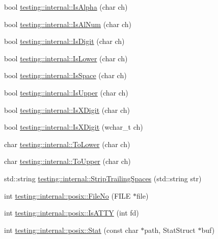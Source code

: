 \begin{DoxyCompactItemize}
\item 
bool \mbox{\hyperlink{namespacetesting_1_1internal_aeb957087fd6bbf9db98ab7cd41b0c129}{testing\+::internal\+::\+Is\+Alpha}} (char ch)
\item 
bool \mbox{\hyperlink{namespacetesting_1_1internal_a83802e7f23324cd512232203662e1a98}{testing\+::internal\+::\+Is\+Al\+Num}} (char ch)
\item 
bool \mbox{\hyperlink{namespacetesting_1_1internal_a4bd96b7fa6486802d33ddc217af55a39}{testing\+::internal\+::\+Is\+Digit}} (char ch)
\item 
bool \mbox{\hyperlink{namespacetesting_1_1internal_ac26ce3883bc8919c27074975e958f3b7}{testing\+::internal\+::\+Is\+Lower}} (char ch)
\item 
bool \mbox{\hyperlink{namespacetesting_1_1internal_af429e04f70f9c10f6aa76a5d1ccd389f}{testing\+::internal\+::\+Is\+Space}} (char ch)
\item 
bool \mbox{\hyperlink{namespacetesting_1_1internal_a84f3baa379fec6bf5947cb5165aa8cc9}{testing\+::internal\+::\+Is\+Upper}} (char ch)
\item 
bool \mbox{\hyperlink{namespacetesting_1_1internal_aa234ef141278263fb143b616c74c86e7}{testing\+::internal\+::\+Is\+X\+Digit}} (char ch)
\item 
bool \mbox{\hyperlink{namespacetesting_1_1internal_a6ab68a30f8291c09b2289c132bbe3b16}{testing\+::internal\+::\+Is\+X\+Digit}} (wchar\+\_\+t ch)
\item 
char \mbox{\hyperlink{namespacetesting_1_1internal_ad9c627ef2a94245e3fd69e7ab3d49b42}{testing\+::internal\+::\+To\+Lower}} (char ch)
\item 
char \mbox{\hyperlink{namespacetesting_1_1internal_ac1b876a8133895bd553d4780ecaa1e3a}{testing\+::internal\+::\+To\+Upper}} (char ch)
\item 
std\+::string \mbox{\hyperlink{namespacetesting_1_1internal_aa6afda12e567c353e2e9b9c2e8cae14f}{testing\+::internal\+::\+Strip\+Trailing\+Spaces}} (std\+::string str)
\item 
int \mbox{\hyperlink{namespacetesting_1_1internal_1_1posix_a3117b067e1f942a2031e666953120ccc}{testing\+::internal\+::posix\+::\+File\+No}} (F\+I\+LE $\ast$file)
\item 
int \mbox{\hyperlink{namespacetesting_1_1internal_1_1posix_a16ebe936b3a8ea462a94191635aedc27}{testing\+::internal\+::posix\+::\+Is\+A\+T\+TY}} (int fd)
\item 
int \mbox{\hyperlink{namespacetesting_1_1internal_1_1posix_a2b87b7ff647a128614daf50667eb9304}{testing\+::internal\+::posix\+::\+Stat}} (const char $\ast$path, Stat\+Struct $\ast$buf)

\end{DoxyCompactItemize}
